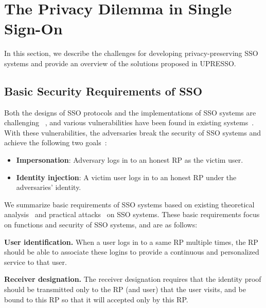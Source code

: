 \section{The Privacy Dilemma in Single Sign-On}
\label{sec:challenge}

In this section, we describe the challenges for developing privacy-preserving SSO systems and provide an overview of the solutions proposed in UPRESSO.



\subsection{Basic Security Requirements of SSO}
\label{subsec:basicrequirements}
Both the designs of SSO protocols and the implementations of SSO systems are challenging ~\cite{SPRESSO},
and various vulnerabilities have been found in existing systems~\cite{SomorovskyMSKJ12,WangCW12,ArmandoCCCPS13,ZhouE14,WangZLLYLG15,WangZLG16,YangLLZH16,MainkaMS16,MohsenS16,MainkaMSW17,YangLCZ18,YangLS17,ShiWL19}.
With these vulnerabilities, the adversaries break the security of SSO systems and achieve the following two goals~\cite{SPRESSO}:
\begin{itemize}
\item \textbf{Impersonation}: Adversary logs in to an honest RP as the victim user.
\item  \textbf{Identity injection}: A victim user logs in to an honest RP under the adversaries' identity.
\end{itemize}

We summarize basic requirements of SSO systems based on existing theoretical analysis~\cite{ArmandoCCCT08,FettKS16, FettKS17} and practical attacks~\cite{SomorovskyMSKJ12,WangCW12,ArmandoCCCPS13,ZhouE14,WangZLLYLG15,WangZLG16,YangLLZH16,MainkaMS16,MohsenS16,MainkaMSW17,YangLCZ18,YangLS17,ShiWL19} on SSO systems. These basic requirements focus on  functions and security of SSO systems, and are as follows:

\vspace{1mm}\noindent\textbf{User identification.} When a user logs in to a same RP multiple times, the RP should be able to associate these logins to provide a continuous and personalized service to that user.

\vspace{1mm}\noindent\textbf{Receiver designation.} The receiver designation requires that the identity proof should  be  transmitted only to the RP (and user) that the user visits, and be bound to this RP so that it will accepted only by this RP.


